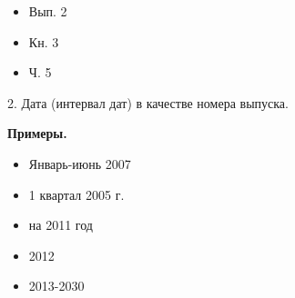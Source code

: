 \vspace{-3mm}
\begin{itemize}
    \setlength\itemsep{-2mm}
    \item Вып. 2
    \item Кн. 3
    \item Ч. 5
\end{itemize}

2. Дата (интервал дат) в качестве номера выпуска.

\textbf{Примеры.}

\vspace{-3mm}
\begin{itemize}
    \setlength\itemsep{-2mm}
    \item Январь-июнь 2007
    \item 1 квартал 2005 г.
    \item на 2011 год
    \item 2012
    \item 2013-2030
\end{itemize}

